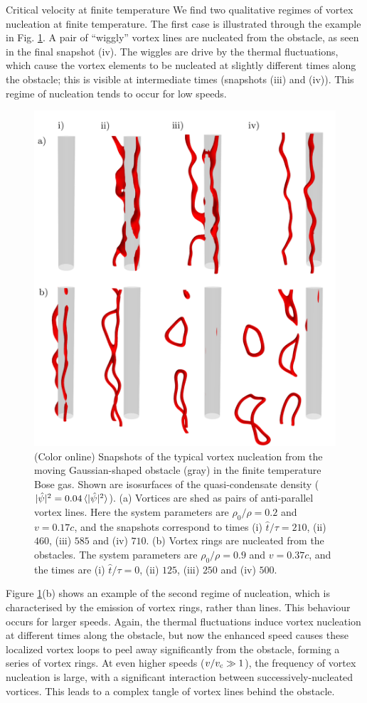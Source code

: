 \begin{chapter}{\label{cha:nonequib}Critical velocity at finite temperature}
We find two qualitative regimes of vortex nucleation at finite temperature.  The first case is illustrated through the example in Fig.  \ref{fig:vort-lines}.  A pair of ``wiggly'' vortex lines are nucleated from the obstacle, as seen in the final snapshot (iv).  The wiggles are drive by the thermal fluctuations, which cause the vortex elements to be nucleated at slightly different times along the obstacle; this is visible at intermediate times (snapshots (iii) and (iv)).   This regime of nucleation tends to occur for low speeds.

\begin{figure}
		\centering
    \includegraphics[width=0.6\linewidth]{nonequib/figures/vort}
    \caption{\label{fig:vort-lines}(Color online) Snapshots of the typical vortex nucleation from the moving Gaussian-shaped obstacle (gray) in the finite temperature Bose gas.  Shown are  isosurfaces of the quasi-condensate density ($|\hat{\psi}|^2 = 0.04\braket{|\hat{\psi}|^2}$).  (a) Vortices are shed as pairs of anti-parallel vortex lines.  Here the system parameters are $\rho_0/\rho = 0.2$ and $v=0.17c$, and the snapshots correspond to times (i) $\hat{t}/\tau=210$, (ii) $460$, (iii) $585$ and (iv) $710$.   (b) Vortex rings are nucleated from the obstacles.  The system parameters are $\rho_0/\rho = 0.9$ and $v=0.37c$, and the times are (i) $\hat{t}/\tau=0$, (ii) $125$, (iii) $250$ and (iv) $500$.}
\end{figure} 


Figure \ref{fig:vort-lines}(b) shows an example of the second regime of nucleation, which is characterised by the emission of vortex rings, rather than lines.  This behaviour occurs for larger speeds.  Again, the thermal fluctuations induce vortex nucleation at different times along the obstacle, but now the enhanced speed causes these localized vortex loops to peel away significantly from the obstacle, forming a series of vortex rings.   
At even higher speeds ($v/v_{\rm c} \gg 1$), the frequency of vortex nucleation is large, with a significant interaction between successively-nucleated vortices.  This leads to a complex tangle of vortex lines behind the obstacle. 


\end{chapter}
